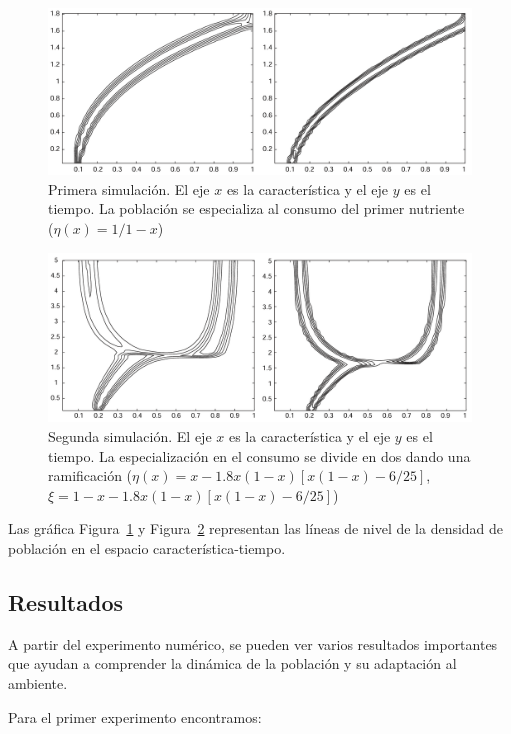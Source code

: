 \begin{figure}[H]
	\centering
	\includegraphics[scale=0.4]{image.png}
	\caption{Primera simulación. El eje $x$ es la característica y el eje $y$ es el tiempo. La población se especializa al consumo del primer nutriente ($\eta(x)=1/1-x$)\citep{dieckman2005}}
	\label{sim1}
\end{figure}

\begin{figure}[H]
	\centering
	\includegraphics[scale=0.4]{Captura de pantalla 2024-12-11 095132.png}
	\caption{Segunda simulación. El eje $x$ es la característica y el eje $y$ es el tiempo. La especialización en el consumo se divide en dos dando una ramificación ($\eta(x)=x-1.8x(1-x)[x(1-x)-6/25]$, $\xi=1-x-1.8x(1-x)[x(1-x)-6/25]$)\citep{dieckman2005}}
	\label{sim2}
\end{figure}
Las gráfica Figura~\ref{sim1} y Figura~\ref{sim2} representan las líneas de nivel de la densidad de población en el espacio característica-tiempo.
\subsection{Resultados}
A partir del experimento numérico, se pueden ver varios resultados importantes que ayudan a comprender la dinámica de la población y su adaptación al ambiente.

Para el primer experimento encontramos:

